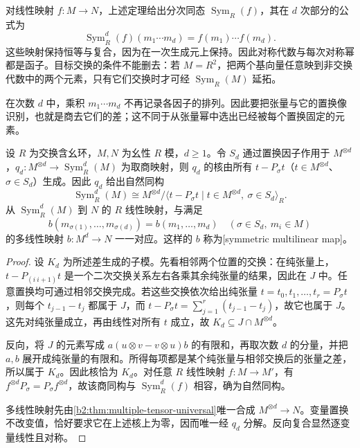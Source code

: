 对线性映射 \(f:M\rightarrow N\)，上述定理给出分次同态 \(\operatorname{Sym}_R(f)\)，其在 \(d\) 次部分的公式为
\[
	\operatorname{Sym}_R^d(f)(m_1\cdots m_d)=f(m_1)\cdots f(m_d).
\]
这些映射保持恒等与复合，因为在一次生成元上保持。因此对称代数与每次对称幂都是函子。目标交换的条件不能删去：若 \(M=R^2\)，把两个基向量任意映到非交换代数中的两个元素，只有它们交换时才可经 \(\operatorname{Sym}_R(M)\) 延拓。

\ProseParagraphBreak
在次数 \(d\) 中，乘积 \(m_1\cdots m_d\) 不再记录各因子的排列。因此要把张量与它的置换像识别，也就是商去它们的差；这不同于从张量幂中选出已经被每个置换固定的元素。

\begin{proposition}\label{b2:prop:symmetric-power-universal}
	设 \(R\) 为交换含幺环，\(M,N\) 为幺性 \(R\) 模，\(d\ge1\)。令 \(S_d\) 通过置换因子作用于 \(M^{\otimes d}\)，\(q_d:M^{\otimes d}\rightarrow\operatorname{Sym}_R^d(M)\) 为取商映射，则 \(q_d\) 的核由所有 \(t-P_\sigma t\)（\(t\in M^{\otimes d}\)、\(\sigma\in S_d\)）生成。因此 \(q_d\) 给出自然同构
	\[
		\operatorname{Sym}_R^d(M)\cong M^{\otimes d}/\langle t-P_\sigma t\mid t\in M^{\otimes d},\ \sigma\in S_d\rangle_R.
	\]
	从 \(\operatorname{Sym}_R^d(M)\) 到 \(N\) 的 \(R\) 线性映射，与满足
	\[
		b(m_{\sigma(1)},\ldots,m_{\sigma(d)})=b(m_1,\ldots,m_d) \quad(\sigma\in S_d,\ m_i\in M)
	\]
	的多线性映射 \(b:M^d\rightarrow N\) 一一对应。这样的 \(b\) 称为[symmetric multilinear map]。
\end{proposition}
\begin{proof}
	设 \(K_d\) 为所述差生成的子模。先看相邻两个位置的交换：在纯张量上，\(t-P_{(i\ i+1)}t\) 是一个二次交换关系左右各乘其余纯张量的结果，因此在 \(J\) 中。任意置换均可通过相邻交换完成。若这些交换依次给出纯张量 \(t=t_0,t_1,\ldots,t_r=P_\sigma t\)，则每个 \(t_{j-1}-t_j\) 都属于 \(J\)，而 \(t-P_\sigma t=\sum_{j=1}^r(t_{j-1}-t_j)\)，故它也属于 \(J\)。这先对纯张量成立，再由线性对所有 \(t\) 成立，故 \(K_d\subseteq J\cap M^{\otimes d}\)。

	反向，将 \(J\) 的元素写成 \(a(u\otimes v-v\otimes u)b\) 的有限和，再取次数 \(d\) 的分量，并把 \(a,b\) 展开成纯张量的有限和。所得每项都是某个纯张量与相邻交换后的张量之差，所以属于 \(K_d\)。因此核恰为 \(K_d\)。对任意 \(R\) 线性映射 \(f:M\to M'\)，有 \(f^{\otimes d}P_\sigma=P_\sigma f^{\otimes d}\)，故该商同构与 \(\operatorname{Sym}_R^d(f)\) 相容，确为自然同构。

	多线性映射先由\cref{b2:thm:multiple-tensor-universal}唯一合成 \(M^{\otimes d}\rightarrow N\)。变量置换不改变值，恰好要求它在上述核上为零，因而唯一经 \(q_d\) 分解。反向复合显然逐变量线性且对称。
\end{proof}


